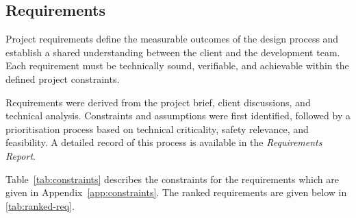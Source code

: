 \subsection{Requirements}
\label{sec:ranked-requirements}

Project requirements define the measurable outcomes of the design process and establish a shared understanding between the client and the development team. Each requirement must be technically sound, verifiable, and achievable within the defined project constraints. 

Requirements were derived from the project brief, client discussions, and technical analysis. Constraints and assumptions were first identified, followed by a prioritisation process based on technical criticality, safety relevance, and feasibility. A detailed record of this process is available in the \textit{Requirements Report}.

Table~\ref{tab:constraints} describes the constraints for the requirements which are given in Appendix~\ref{app:constraints}. The ranked requirements are given below in \ref{tab:ranked-req}.

